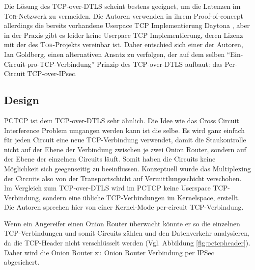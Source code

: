 \documentclass[fleqn,envcountsame,runningheads,10pt,a4paper]{llncs}
\begin{document}
Die Lösung des TCP-over-DTLS scheint bestens geeignet, um die Latenzen im \textsc{Tor}-Netzwerk zu vermeiden. Die Autoren verwenden in ihrem Proof-of-concept allerdings die bereits vorhandene Userpace TCP Implementierung Daytona \cite{daytona}, aber in der Praxis gibt es leider keine Userpace TCP  Implementierung, deren Lizenz mit der des \textsc{Tor}-Projekts vereinbar ist. Daher entschied sich einer der Autoren, Ian Goldberg, einen alternativen Ansatz zu verfolgen, der auf dem selben ``Ein-Circuit-pro-TCP-Verbindung'' Prinzip des  TCP-over-DTLS aufbaut: das Per-Circuit TCP-over-IPsec. 

\begin{figure}[h]
\end{figure} 

\subsection{Design}

PCTCP ist dem TCP-over-DTLS sehr ähnlich. Die Idee wie das Cross Circuit Interference Problem umgangen werden kann ist die selbe. Es wird ganz einfach für jeden Circuit eine neue TCP-Verbindung verwendet, damit die Staukontrolle nicht auf der Ebene der Verbindung zwischen je zwei Onion Router, sondern auf der Ebene der einzelnen Circuits läuft. Somit haben die Circuits keine Möglichkeit sich geegenseitig zu beeinflussen. Konzeptuell wurde das Multiplexing der Circuits also von der Transportschicht auf Vermittlungsschicht verschoben. Im Vergleich zum TCP-over-DTLS wird im PCTCP keine Userspace TCP-Verbindung, sondern eine übliche TCP-Verbindungen im Kernelspace, erstellt. Die Autoren sprechen hier von einer Kernel-Mode per-circuit TCP-Verbindung. 

Wenn ein Angereifer einen Onion Router überwacht könnte er so die einzelnen TCP-Verbindungen und somit Circuits zählen und den Datenverkehr analysieren, da die TCP-Header nicht verschlüsselt werden (Vgl. Abbildung \ref{fig:pctcpheader}). Daher wird die Onion Router zu Onion Router Verbindung per IPSec abgesichert.
\end{document}
